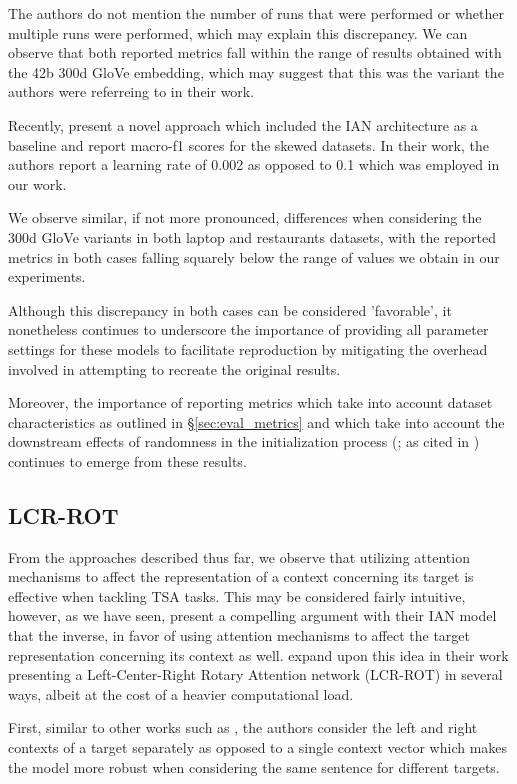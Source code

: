 \documentclass[../../fyp.tex]{subfiles}
\begin{document}
The authors do not mention the number of runs that were performed or whether multiple runs were performed, which may explain this discrepancy. We can observe that both reported metrics fall within the range of results obtained with the 42b 300d GloVe embedding, which may suggest that this was the variant the authors were referreing to in their work. 

Recently, \citet{navonil2020} present a novel approach which included the IAN architecture as a baseline and report macro-f1 scores for the skewed datasets. In their work, the authors report a learning rate of 0.002 as opposed to 0.1 which was employed in our work. 

We observe similar, if not more pronounced, differences when considering the 300d GloVe variants in both laptop and restaurants datasets, with the reported metrics in both cases falling squarely below the range of values we obtain in our experiments. 

Although this discrepancy in both cases can be considered 'favorable', it nonetheless continues to underscore the importance of providing all parameter settings for these models to facilitate reproduction by mitigating the overhead involved in attempting to recreate the original results. 

Moreover, the importance of reporting metrics which take into account dataset characteristics as outlined in \S\ref{sec:eval_metrics} and which take into account the downstream effects of randomness in the initialization process (\citet{reimers2017}; as cited in \citet{moore2018}) continues to emerge from these results. 

\subsection{LCR-ROT}
From the approaches described thus far, we observe that utilizing attention mechanisms to affect the representation of a context concerning its target is effective when tackling TSA tasks. This may be considered fairly intuitive, however, as we have seen, \citet{dehongma2017} present a compelling argument with their IAN model that the inverse, in favor of using attention mechanisms to affect the target representation concerning its context as well. \citet{zheng2018} expand upon this idea in their work presenting a Left-Center-Right Rotary Attention network (LCR-ROT) in several ways, albeit at the cost of a heavier computational load. 

First, similar to other works such as \citet{tang2016,chen2017}, the authors consider the left and right contexts of a target separately as opposed to a single context vector which makes the model more robust when considering the same sentence for different targets. 
\end{document}
